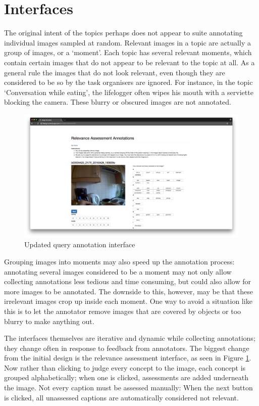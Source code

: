 \section{Interfaces}

The original intent of the topics perhaps does not appear to suite annotating individual images sampled at random. Relevant images in a topic are actually a group of images, or a `moment'. Each topic has several relevant moments, which contain certain images that do not appear to be relevant to the topic at all. As a general rule the images that do not look relevant, even though they are considered to be so by the task organisers are ignored. For instance, in the topic `Conversation while eating', the lifelogger often wipes his mouth with a serviette blocking the camera. These blurry or obscured images are not annotated. 

\begin{figure}[hb]
    \centering
    \includegraphics[width=1\textwidth]{images/new-rel-ass-interface}
    \caption{Updated query annotation interface}
    \label{fig:new-rel-ass}
\end{figure}

\newpage
Grouping images into moments may also speed up the annotation process: annotating several images considered to be a moment may not only allow collecting annotations less tedious and time consuming, but could also allow for more images to be annotated. The downside to this, however, may be that these irrelevant images crop up inside each moment. One way to avoid a situation like this is to let the annotator remove images that are covered by objects or too blurry to make anything out.

The interfaces themselves are iterative and dynamic while collecting annotations; they change often in response to feedback from annotators. The biggest change from the initial design is the relevance assessment interface, as seen in Figure \ref{fig:new-rel-ass}. Now rather than clicking to judge every concept to the image, each concept is grouped alphabetically; when one is clicked, assessments are added underneath the image. Not every caption must be assessed manually: When the next button is clicked, all unassessed captions are automatically considered not relevant. 
